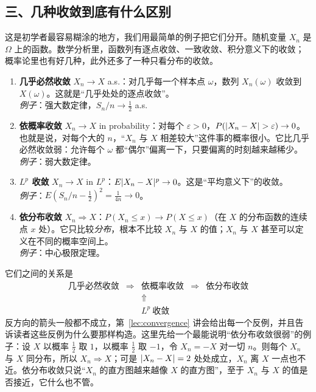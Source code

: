 \subsection*{三、几种收敛到底有什么区别}

这是初学者最容易糊涂的地方，我们用最简单的例子把它们分开。随机变量 $X_n$ 是 $\Omega$ 上的函数。数学分析里，函数列有逐点收敛、一致收敛、积分意义下的收敛；概率论里也有好几种，此外还多了一种只看分布的收敛。

\begin{enumerate}
\item \textbf{几乎必然收敛} $X_n\to X$ a.s.：对几乎每一个样本点 $\omega$，数列 $X_n(\omega)$ 收敛到 $X(\omega)$。这就是“几乎处处的逐点收敛”。\\
\emph{例子}：强大数定律，$S_n/n\to\frac12$ a.s.
\item \textbf{依概率收敛} $X_n\to X$ in probability：对每个 $\varepsilon>0$，$P(\lvert X_n-X\rvert>\varepsilon)\to0$。也就是说，对每个大的 $n$，“$X_n$ 与 $X$ 相差较大”这件事的概率很小。它比几乎必然收敛弱：允许每个 $\omega$ 都“偶尔”偏离一下，只要偏离的时刻越来越稀少。\\
\emph{例子}：弱大数定律。
\item \textbf{$L^p$ 收敛} $X_n\to X$ in $L^p$：$E\lvert X_n-X\rvert^p\to0$。这是“平均意义下”的收敛。\\
\emph{例子}：$E(S_n/n-\frac12)^2=\frac1{4n}\to0$。
\item \textbf{依分布收敛} $X_n\Rightarrow X$：$P(X_n\leqslant x)\to P(X\leqslant x)$（在 $X$ 的分布函数的连续点 $x$ 处）。它只比较\emph{分布}，根本不比较 $X_n$ 与 $X$ 的值；$X_n$ 与 $X$ 甚至可以定义在不同的概率空间上。\\
\emph{例子}：中心极限定理。
\end{enumerate}

它们之间的关系是
\[
\begin{array}{ccccc}
\text{几乎必然收敛}&\Longrightarrow&\text{依概率收敛}&\Longrightarrow&\text{依分布收敛}\\
&&\Uparrow&&\\
&&L^p\ \text{收敛}&&
\end{array}
\]
反方向的箭头一般都不成立，第~\ref{lec:convergence} 讲会给出每一个反例，并且告诉读者这些反例为什么要那样构造。这里先给一个最能说明“依分布收敛很弱”的例子：设 $X$ 以概率 $\frac12$ 取 $1$，以概率 $\frac12$ 取 $-1$，令 $X_n=-X$ 对一切 $n$。则每个 $X_n$ 与 $X$ 同分布，所以 $X_n\Rightarrow X$；可是 $\lvert X_n-X\rvert=2$ 处处成立，$X_n$ 离 $X$ 一点也不近。依分布收敛只说“$X_n$ 的直方图越来越像 $X$ 的直方图”，至于 $X_n$ 与 $X$ 的值是否接近，它什么也不管。

